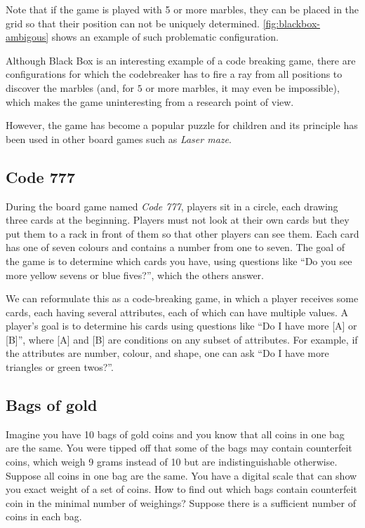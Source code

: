 Note that if the game is played with 5 or more marbles,
  they can be placed in the grid so that their position can
  not be uniquely determined.
\autoref{fig:blackbox-ambigous} shows an example of such
  problematic configuration.

Although Black Box is an interesting example of a code breaking game,
  there are configurations for which the codebreaker has to fire a ray from
  all positions to discover the marbles
  (and, for $5$ or more marbles, it may even be impossible),
  which makes the game uninteresting from a research point of view.

However, the game has become a popular puzzle for children and
  its principle has been used in other board games such as \emph{Laser maze}\cite{lasermaze}.

\subsection{Code 777}

During the board game named \emph{Code 777}, players sit in a circle,
  each drawing three cards at the beginning.
Players must not look at their own cards but they put them to a rack in front of them
  so that other players can see them.
Each card has one of seven colours and contains a number from one to seven.
The goal of the game is to determine which cards you have, using questions like
 ``Do you see more yellow sevens or blue fives?'', which the others answer\cite{code777}.

We can reformulate this as a code-breaking game, in which a player
  receives some cards, each having several attributes, each of which can have
  multiple values.
A player's goal is to determine his cards using questions
  like ``Do I have more [A] or [B]'', where [A] and [B] are conditions on
  any subset of attributes.
For example, if the attributes are number, colour, and shape, one can ask
  ``Do I have more triangles or green twos?''.

\subsection{Bags of gold}

Imagine you have 10 bags of gold coins and
  you know that all coins in one bag are the same.
You were tipped off that some of the bags may contain counterfeit coins,
  which weigh 9 grams instead of 10 but are indistinguishable otherwise.
Suppose all coins in one bag are the same.
You have a digital scale that can show you exact weight of a set of coins.
How to find out which bags contain counterfeit coin in
  the minimal number of weighings?
Suppose there is a sufficient number of coins in each bag.

